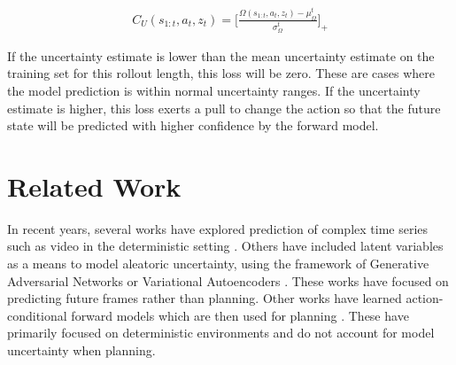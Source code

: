 \documentclass{article} %
\begin{document}
    \begin{align}
      C_U(s_{1:t}, a_t, z_t) = \Big [ \frac{\Omega(s_{1:t}, a_t, z_t) - \mu_\Omega^t}{\sigma_\Omega^t} \Big]_+
    \end{align}

    If the uncertainty estimate is lower than the mean uncertainty estimate on the training set for this rollout length, this loss will be zero.
    These are cases where the model prediction is within normal uncertainty ranges. If the uncertainty estimate is higher, this loss exerts a pull to change the action so that the future state will be predicted with higher confidence by the forward model.



\section{Related Work}

In recent years, several works have explored prediction of complex time series such as video in the deterministic setting \citep{VPN,Srivastava15,DentonB17}.
Others have included latent variables as a means to model aleatoric uncertainty, using the framework of Generative Adversarial Networks \citep{mathieu-iclr-2016} or Variational Autoencoders \citep{Villegas17, Babaeizadeh2018, Denton2018}. These works have focused on predicting future frames rather than planning.
Other works have learned action-conditional forward models which are then used for planning \citep{Oh15, FinnGL16, Poke, VPN, UPN}. These have primarily focused on deterministic environments and do not account for model uncertainty when planning.

\end{document}
